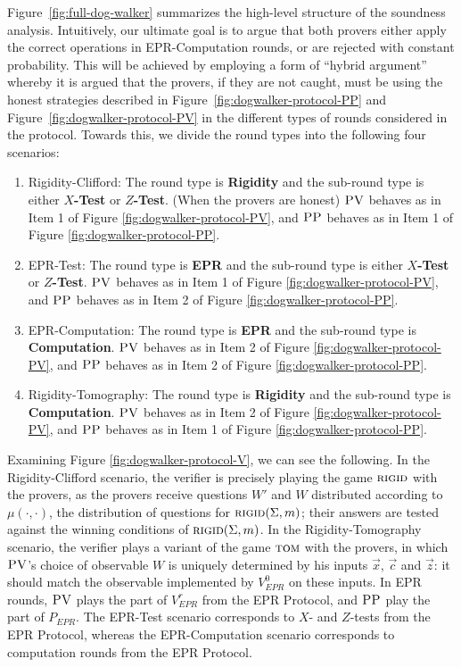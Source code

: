 \documentclass[11pt]{article}
\theoremstyle{remark}
\theoremstyle{definition}
\newcommand{\rigid}{\textsc{rigid}}
\newcommand{\tom}{\textsc{tom}}
\newcommand{\pv}{\textsc{PV}}
\newcommand{\pp}{\textsc{PP}}
\begin{document}
Figure~\ref{fig:full-dog-walker} summarizes the high-level structure of the soundness analysis. Intuitively, our ultimate goal is to argue that both provers either apply the correct operations in EPR-Computation rounds, or are rejected with constant probability. This will be achieved by employing a form of ``hybrid argument'' whereby it is argued that the provers, if they are not caught, must be using the honest strategies described in Figure~\ref{fig:dogwalker-protocol-PP} and Figure~\ref{fig:dogwalker-protocol-PV} in the different types of rounds considered in the protocol. Towards this, we divide the round types into the following four scenarios:
\begin{enumerate}
\item Rigidity-Clifford: The round type is \textbf{Rigidity} and the sub-round type is either \textbf{$X$-Test} or \textbf{$Z$-Test}. (When the provers are honest) $\pv$ behaves as in Item 1 of Figure \ref{fig:dogwalker-protocol-PV}, and $\pp$ behaves as in Item 1 of Figure \ref{fig:dogwalker-protocol-PP}. 
\item EPR-Test: The round type is \textbf{EPR} and the sub-round type is either \textbf{$X$-Test} or \textbf{$Z$-Test}. $\pv$ behaves as  in Item 1 of Figure \ref{fig:dogwalker-protocol-PV}, and $\pp$ behaves as in Item 2 of Figure \ref{fig:dogwalker-protocol-PP}. 
\item EPR-Computation: The round type is \textbf{EPR} and the sub-round type is \textbf{Computation}. $\pv$ behaves as in Item 2 of Figure \ref{fig:dogwalker-protocol-PV}, and $\pp$ behaves as in Item 2 of Figure \ref{fig:dogwalker-protocol-PP}. 
\item Rigidity-Tomography: The round type is \textbf{Rigidity} and the sub-round type is \textbf{Computation}. $\pv$ behaves as in Item 2 of Figure \ref{fig:dogwalker-protocol-PV}, and $\pp$ behaves as in Item 1 of Figure \ref{fig:dogwalker-protocol-PP}. 
\end{enumerate}
Examining Figure \ref{fig:dogwalker-protocol-V}, we can see the following. In the Rigidity-Clifford scenario, the verifier is precisely playing the game $\rigid$ with the provers, as the provers receive questions $W'$ and $W$ distributed according to $\mu(\cdot,\cdot)$, the distribution of questions for $\rigid(\Sigma,m)$; their answers are tested against the winning conditions of $\rigid(\Sigma,m)$. In the Rigidity-Tomography scenario, the verifier plays a variant of the game $\tom$ with the provers, in which $\pv$'s choice of observable $W$ is uniquely determined by his inputs $\vec{x}$, $\vec{c}$ and $\vec{z}$: it should match the observable implemented by $V_{EPR}^0$ on these inputs. In EPR rounds, $\pv$ plays the part of $V_{EPR}^r$ from the EPR Protocol, and $\pp$ play the part of $P_{EPR}$. The EPR-Test scenario corresponds to $X$- and $Z$-tests from the EPR Protocol, whereas the EPR-Computation scenario corresponds to computation rounds from the EPR Protocol.
\end{document}
